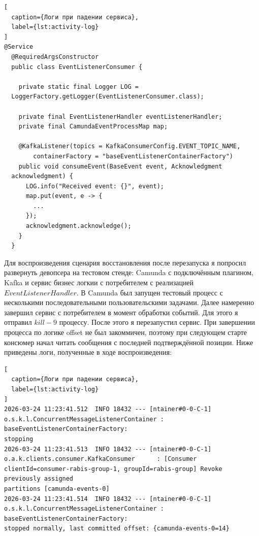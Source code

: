 \begin{lstlisting}[
  caption={Логи при падении сервиса},
  label={lst:activity-log}
]
@Service                                                               
  @RequiredArgsConstructor
  public class EventListenerConsumer {

    private static final Logger LOG =                                    
  LoggerFactory.getLogger(EventListenerConsumer.class);
                                                                         
    private final EventListenerHandler eventListenerHandler;
    private final CamundaEventProcessMap map;

    @KafkaListener(topics = KafkaConsumerConfig.EVENT_TOPIC_NAME,        
        containerFactory = "baseEventListenerContainerFactory")
    public void consumeEvent(BaseEvent event, Acknowledgment             
  acknowledgment) {
      LOG.info("Received event: {}", event);
      map.put(event, e -> {
        ...                                                              
      });         
      acknowledgment.acknowledge();                                      
    }             
  }
\end{lstlisting}

Для воспроизведения сценария восстановления после перезапуска я        
попросил развернуть девопсера на тестовом стенде: Camunda с подключённым плагином, Kafka и     
сервис бизнес логкии с потребителем с реализацией $EventListenerHandler$. В Camunda был   
запущен тестовый процесс с несколькими последовательными пользовательскими задачами.
Далее намеренно завершил       
сервис с потребителем в момент обработки событий. Для этого я отправил $kill -9$ процессу. После этого
я перезапустил сервис. При завершении процесса по логике offset не был закоммичен,      
поэтому при следующем старте консюмер начал читать сообщения с
последней подтверждённой позиции. Ниже приведены логи, полученные в    
ходе воспроизведения:
                             
\begin{lstlisting}[
  caption={Логи при падении сервиса},
  label={lst:activity-log}
]
2026-03-24 11:23:41.512  INFO 18432 --- [ntainer#0-0-C-1]
o.s.k.l.ConcurrentMessageListenerContainer : baseEventListenerContainerFactory:
stopping
2026-03-24 11:23:41.513  INFO 18432 --- [ntainer#0-0-C-1]
o.a.k.clients.consumer.KafkaConsumer      : [Consumer
clientId=consumer-rabis-group-1, groupId=rabis-group] Revoke previously assigned
partitions [camunda-events-0]
2026-03-24 11:23:41.514  INFO 18432 --- [ntainer#0-0-C-1]
o.s.k.l.ConcurrentMessageListenerContainer : baseEventListenerContainerFactory:
stopped normally, last committed offset: {camunda-events-0=14}
\end{lstlisting}
                   
